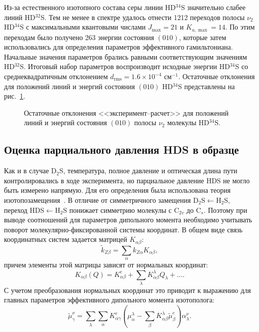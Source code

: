 Из-за естественного изотопного состава серы линии HD$^{34}$S значительно слабее линий HD$^{32}$S.
Тем не менее в спектре удалось отнести 1212 переходов полосы $\nu_2$ HD$^{34}$S с максимальными
квантовыми числами $J_{\max}=21$ и $K_{a,\max}=14$. По этим переходам было получено 263 энергии
состояния $(010)$, которые затем использовались для определения параметров эффективного гамильтониана.
Начальные значения параметров брались равными соответствующим значениям HD$^{32}$S. Итоговый набор
параметров воспроизводит исходные энергии HD$^{34}$S со среднеквадратичным отклонением
$d_{\textrm{rms}}=1.6\times10^{-4}$ см$^{-1}$. Остаточные отклонения для положений линий и энергий
состояния $(010)$ HD$^{34}$S представлены на рис.~\ref{fig:hds34_residuals}.

\begin{figure}[htbp]
    \centering
    \caption{Остаточные отклонения <<эксперимент--расчет>> для положений линий и энергий состояния
    $(010)$ полосы $\nu_2$ молекулы HD$^{34}$S.}
    \label{fig:hds34_residuals}
\end{figure}

\subsection{Оценка парциального давления HDS в образце}

Как и в случае D$_2$S, температура, полное давление и оптическая длина пути контролировались в ходе
эксперимента, но парциальное давление HDS не могло быть измерено напрямую. Для его определения была
использована теория изотопозамещения~\cite{byk}. В отличие от симметричного замещения
D$_2$S$\leftarrow$H$_2$S, переход HDS$\leftarrow$H$_2$S понижает симметрию молекулы с C$_{2v}$ до C$_s$.
Поэтому при выводе соотношений для параметров дипольного момента необходимо учитывать поворот
молекулярно-фиксированной системы координат. В общем виде связь координатных систем задается
матрицей $K_{\alpha\beta}$:
\begin{equation}
\widetilde{k}_{Z\beta}=\sum_{\alpha} k_{Z\alpha}K_{\alpha\beta},
\label{eq:hds_k_rotation}
\end{equation}
причем элементы этой матрицы зависят от нормальных координат:
\begin{equation}
K_{\alpha\beta}(Q)=K^{e}_{\alpha\beta}+
\sum_{\lambda}K^{\lambda}_{\alpha\beta}Q_{\lambda}+\ldots .
\label{eq:hds_k_expansion}
\end{equation}
С учетом преобразования нормальных координат это приводит к выражению для главных параметров
эффективного дипольного момента изотополога:
\begin{equation}
\widetilde{\mu}^{\nu}_{\gamma}=\sum_{\lambda}\sum_{\alpha}
K^{e}_{\alpha\gamma}
\left(\mu^{\lambda}_{\alpha}-\sum_{\beta}K^{\lambda}_{\alpha\beta}
\widetilde{\mu}^{e}_{\beta}\right)\alpha^{\nu}_{\lambda}.
\label{eq:hds_mu_iso_general}
\end{equation}

